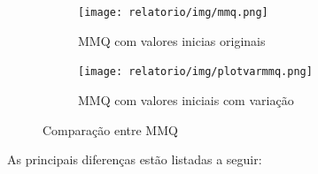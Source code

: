 \documentclass[12pt, a4paper]{article}
\begin{document}
\begin{figure}[H]
    \centering
    \begin{subfigure}{1.0\textwidth}
        \centering
        \texttt{[image: relatorio/img/mmq.png]}
        \caption{MMQ com valores inicias originais}
        \label{fig:mmq-original}
    \end{subfigure}
    \vfill
    \begin{subfigure}{1.0\textwidth}
        \centering
        \texttt{[image: relatorio/img/plotvarmmq.png]}
        \caption{MMQ com valores iniciais com variação}
        \label{fig:mmq-var}
    \end{subfigure}
    \caption{Comparação entre MMQ}
    \label{fig:comparacao-mmq}
\end{figure}

As principais diferenças estão listadas a seguir:
\end{document}
